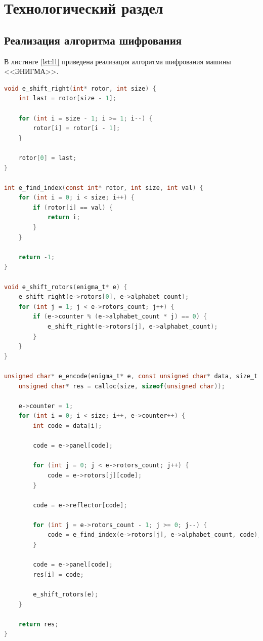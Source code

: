 \chapter{Технологический раздел}

\section{Реализация алгоритма шифрования}

В листинге \ref{lst:l1} приведена реализация алгоритма шифрования машины <<ЭНИГМА>>.

\begin{lstlisting}[language=C, label=lst:l1, caption={Реализация алгоритма шифрования}]
void e_shift_right(int* rotor, int size) {
    int last = rotor[size - 1];

    for (int i = size - 1; i >= 1; i--) {
        rotor[i] = rotor[i - 1];
    }

    rotor[0] = last;
}

int e_find_index(const int* rotor, int size, int val) {
    for (int i = 0; i < size; i++) {
        if (rotor[i] == val) {
            return i;
        }
    }

    return -1;
}

void e_shift_rotors(enigma_t* e) {
    e_shift_right(e->rotors[0], e->alphabet_count);
    for (int j = 1; j < e->rotors_count; j++) {
        if (e->counter % (e->alphabet_count * j) == 0) {
            e_shift_right(e->rotors[j], e->alphabet_count);
        }
    }
}

unsigned char* e_encode(enigma_t* e, const unsigned char* data, size_t size) {
    unsigned char* res = calloc(size, sizeof(unsigned char));

    e->counter = 1;
    for (int i = 0; i < size; i++, e->counter++) {
        int code = data[i];

        code = e->panel[code];

        for (int j = 0; j < e->rotors_count; j++) {
            code = e->rotors[j][code];
        }

        code = e->reflector[code];

        for (int j = e->rotors_count - 1; j >= 0; j--) {
            code = e_find_index(e->rotors[j], e->alphabet_count, code);
        }

        code = e->panel[code];
        res[i] = code;
        
        e_shift_rotors(e);
    }

    return res;
}
\end{lstlisting}

